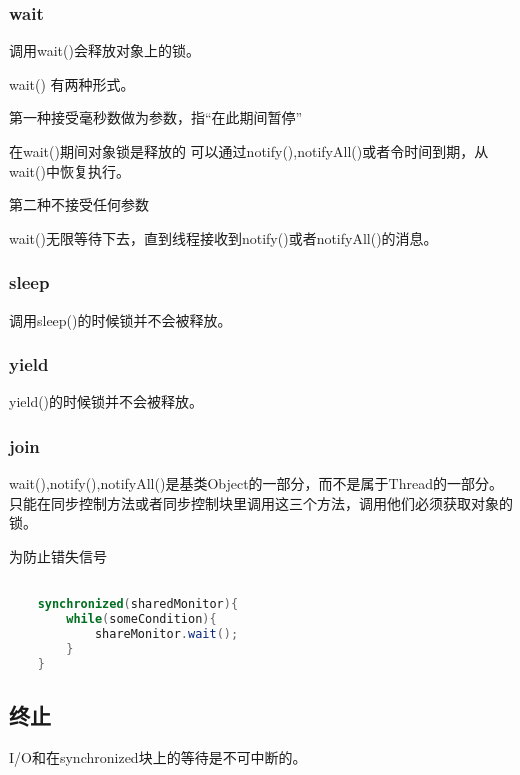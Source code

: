 \subsubsection{wait}
调用wait()会释放对象上的锁。 

wait() 有两种形式。

第一种接受毫秒数做为参数，指“在此期间暂停”

在wait()期间对象锁是释放的
可以通过notify(),notifyAll()或者令时间到期，从wait()中恢复执行。

第二种不接受任何参数

wait()无限等待下去，直到线程接收到notify()或者notifyAll()的消息。

\subsubsection{sleep}
 调用sleep()的时候锁并不会被释放。

 \subsubsection{yield}
 yield()的时候锁并不会被释放。

\subsubsection{join}


wait(),notify(),notifyAll()是基类Object的一部分，而不是属于Thread的一部分。
只能在同步控制方法或者同步控制块里调用这三个方法，调用他们必须获取对象的锁。

为防止错失信号

\begin{lstlisting}[language=java]

    synchronized(sharedMonitor){
        while(someCondition){
            shareMonitor.wait();
        }
    }

\end{lstlisting}



\subsection{终止}

I/O和在synchronized块上的等待是不可中断的。













